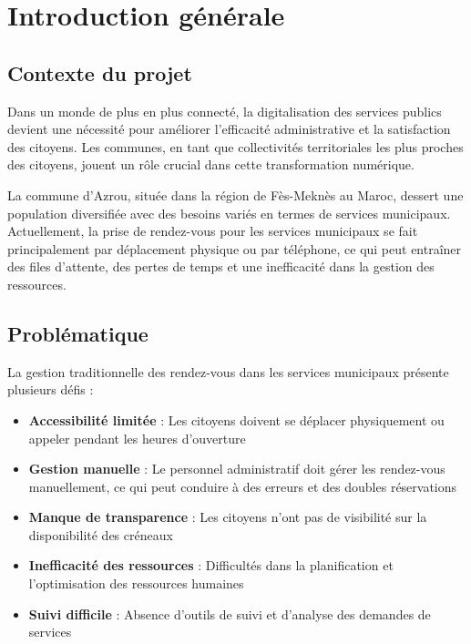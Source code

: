 \chapter{Introduction générale}

\section{Contexte du projet}

Dans un monde de plus en plus connecté, la digitalisation des services publics devient une nécessité pour améliorer l'efficacité administrative et la satisfaction des citoyens. Les communes, en tant que collectivités territoriales les plus proches des citoyens, jouent un rôle crucial dans cette transformation numérique.

La commune d'Azrou, située dans la région de Fès-Meknès au Maroc, dessert une population diversifiée avec des besoins variés en termes de services municipaux. Actuellement, la prise de rendez-vous pour les services municipaux se fait principalement par déplacement physique ou par téléphone, ce qui peut entraîner des files d'attente, des pertes de temps et une inefficacité dans la gestion des ressources.

\section{Problématique}

La gestion traditionnelle des rendez-vous dans les services municipaux présente plusieurs défis :

\begin{itemize}
    \item \textbf{Accessibilité limitée} : Les citoyens doivent se déplacer physiquement ou appeler pendant les heures d'ouverture
    \item \textbf{Gestion manuelle} : Le personnel administratif doit gérer les rendez-vous manuellement, ce qui peut conduire à des erreurs et des doubles réservations
    \item \textbf{Manque de transparence} : Les citoyens n'ont pas de visibilité sur la disponibilité des créneaux
    \item \textbf{Inefficacité des ressources} : Difficultés dans la planification et l'optimisation des ressources humaines
    \item \textbf{Suivi difficile} : Absence d'outils de suivi et d'analyse des demandes de services
\end{itemize}

